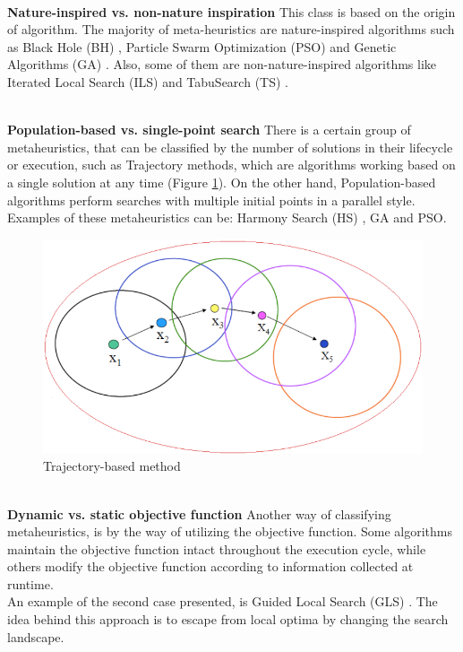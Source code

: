 ~\\
\textbf{Nature-inspired vs. non-nature inspiration }
This class is based on the origin of algorithm. The majority of meta-heuristics are nature-inspired algorithms such as Black Hole (BH) \cite{Rubio2016}, Particle Swarm Optimization (PSO) \cite{Duran:2010:CPS:1645454.1645859} and Genetic Algorithms (GA) \cite{DBLP:conf/icsi/CrawfordSPJPO14}. Also, some of them are non-nature-inspired algorithms like Iterated Local Search (ILS) \cite{DBLP:journals/networks/AringhieriGHS16} and TabuSearch (TS) \cite{DBLP:journals/eswa/SotoCGMP13}.

~\\
\textbf{Population-based vs. single-point search}
There is a certain group of metaheuristics, that can be classified by the number of solutions in their lifecycle or execution, such as Trajectory methods, which are algorithms working based on a single solution at any time (Figure \ref{fig:trajectory-method}). On the other hand, Population-based algorithms perform searches with multiple initial points in a parallel style. Examples of these metaheuristics can be: Harmony Search (HS) \cite{DBLP:conf/ccece/Al-AjmiE14}, GA \cite{Aupetit2008} and PSO. 

\squeezeup
\begin{figure}[ht]
	\centering
  \includegraphics[scale=0.5]{MarcoTeorico/imagenes/trajectory-mh.png}
	\caption{Trajectory-based method}\label{fig:trajectory-method}
\end{figure}
\squeezeup

~\\
\textbf{Dynamic vs. static objective function}
Another way of classifying metaheuristics, is by the way of utilizing the objective function. Some algorithms maintain the objective function intact throughout the execution cycle, while others modify the objective function according to information collected at runtime.\\
An example of the second case presented, is Guided Local Search (GLS) \cite{DBLP:journals/eor/VansteenwegenSBO09}.  The idea behind this approach is to escape from local optima by changing the search landscape. 

